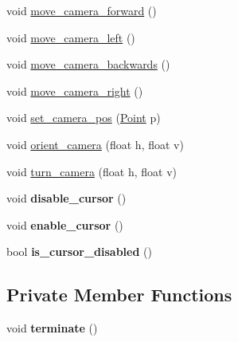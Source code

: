 \begin{DoxyCompactItemize}
void \mbox{\hyperlink{classagl_1_1AGL_a0ef401fb5befea5f84a8342550354279}{move\+\_\+camera\+\_\+forward}} ()
\item 
void \mbox{\hyperlink{classagl_1_1AGL_a531a702149d0781c35fe87a01ea2bf67}{move\+\_\+camera\+\_\+left}} ()
\item 
void \mbox{\hyperlink{classagl_1_1AGL_aeef87301449abfa2ee58c6851788176c}{move\+\_\+camera\+\_\+backwards}} ()
\item 
void \mbox{\hyperlink{classagl_1_1AGL_a33dcc3992c41527b3148ca14bdb76c5f}{move\+\_\+camera\+\_\+right}} ()
\item 
void \mbox{\hyperlink{classagl_1_1AGL_a50d1ea2ee2e612e0606b1a8634396d89}{set\+\_\+camera\+\_\+pos}} (\mbox{\hyperlink{classagl_1_1Point}{Point}} p)
\item 
void \mbox{\hyperlink{classagl_1_1AGL_a9c5161c4171079ee6d4a39427924770b}{orient\+\_\+camera}} (float h, float v)
\item 
void \mbox{\hyperlink{classagl_1_1AGL_a864defc42cebdd263cef17adeb313a97}{turn\+\_\+camera}} (float h, float v)
\item 
\mbox{\label{classagl_1_1AGL_a82ce02596efb1389062242ba6e70b95c}} 
void {\bfseries disable\+\_\+cursor} ()
\item 
\mbox{\label{classagl_1_1AGL_a4943ecf7d2a2f2bafcaa78e6fa595a40}} 
void {\bfseries enable\+\_\+cursor} ()
\item 
\mbox{\label{classagl_1_1AGL_a2ca539ef7ecafb3240d747158798a168}} 
bool {\bfseries is\+\_\+cursor\+\_\+disabled} ()
\end{DoxyCompactItemize}
\subsection*{Private Member Functions}
\begin{DoxyCompactItemize}
\item 
\mbox{\label{classagl_1_1AGL_ad5b05b52ef2b4879f61f0ad9fad86000}} 
void {\bfseries terminate} ()
\end{DoxyCompactItemize}
